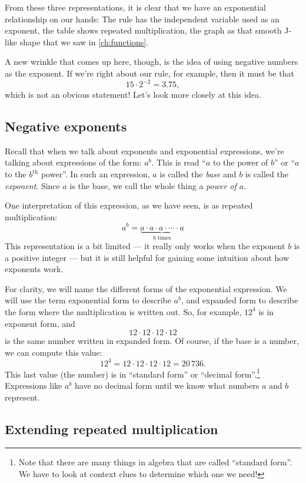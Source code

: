 From these three representations, it is clear that we have an exponential relationship on our hands: The rule has the independent variable used as an exponent, the table shows repeated multiplication, the graph as that smooth J-like shape that we saw in \cref{ch:functions}.

A new wrinkle that comes up here, though, is the idea of using negative numbers as the exponent. If we're right about our rule, for example, then it must be that \[15 \cdot 2^{-2} = 3.75,\]
which is not an obvious statement! Let's look more closely at this idea.

\subsection{Negative exponents}
\label{sec:exponegative}

Recall that when we talk about exponents and exponential expressions, we're talking about expressions of the form: $a^b$. This is read ``$a$ to the power of $b$'' or ``$a$ to the $b^{\text{th}}$ power''. In such an expression, $a$ is called the \textit{base} and $b$ is called the \textit{exponent}. Since $a$ is the base, we call the whole thing a \textit{power of $a$}.

One interpretation of this expression, as we have seen, is as repeated multiplication:
\[a^b = \underbrace{a \cdot a \cdot a \cdot \dotsm \cdot a}_{\text{$b$ times}}\]
This representation is a bit limited --- it really only works when the exponent $b$ is a positive integer --- but it is still helpful for gaining some intuition about how exponents work.

For clarity, we will name the different forms of the exponential expression. We will use the term \gls{exponential form} to describe $a^b$, and \gls{expanded form} to describe the form where the multiplication is written out. So, for example, $12^4$ is in exponent form, and \[12\cdot12\cdot12\cdot12\] is the same number written in expanded form. Of course, if the base is a number, we can compute this value: \[12^4 = 12\cdot12\cdot12\cdot12 = 20\,736.\] This last value (the number) is in ``standard form'' or ``decimal form''.\footnote{Note that there are many things in algebra that are called ``standard form''. We have to look at context clues to determine which one we need!} Expressions like $a^b$ have no decimal form until we know what numbers $a$ and $b$ represent.

\subsection{Extending repeated multiplication}

